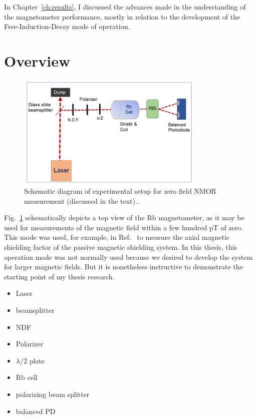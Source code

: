 In Chapter~\ref{ch:results}, I discussed the advances made in the
understanding of the magnetometer performance, mostly in relation to
the development of the Free-Induction-Decay mode of operation.


\section{Overview}

\begin{figure}%
\centering
\includegraphics[width=0.8\textwidth]{figures/experimental_setup_zero_field}
\caption{Schematic diagram of experimental setup for zero field NMOR
  measurement (discussed in the text).\label{fig:zerofield}.}
\end{figure}

Fig.~\ref{fig:zerofield} schematically depicts a top view of the Rb
magnetometer, as it may be used for measurements of the magnetic field
within a few hundred pT of zero.  This mode was used, for example, in
Ref.~\cite{bib:nmor} to measure the axial magnetic shielding factor of
the passive magnetic shielding system.  In this thesis, this operation
mode was not normally used because we desired to develop the system
for larger magnetic fields.  But it is nonetheless instructive to
demonstrate the starting point of my thesis research.

\begin{itemize}
\item Laser
\item beamsplitter
\item NDF
\item Polarizer
\item $\lambda/2$ plate
\item Rb cell
\item polarizing beam splitter
\item balanced PD 
\end{itemize}

